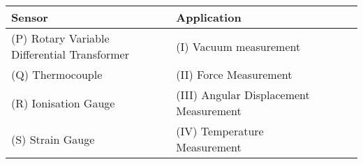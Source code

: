 \begin{tabular}{|l|l|l|l|l|}
   \hline
   \textbf{Sensor} & \textbf{Application}\\
   \hline
    (P) Rotary Variable Differential Transformer & (I) Vacuum measurement\\
    \hline
    (Q) Thermocouple & (II) Force Measurement\\
    \hline
    (R) Ionisation Gauge & (III) Angular Displacement Measurement\\
    \hline
    (S) Strain Gauge & (IV) Temperature Measurement \\
    \hline
\end{tabular}